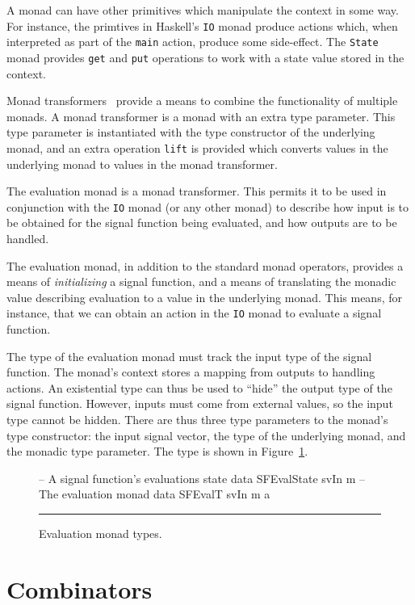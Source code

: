 A monad can have other primitives which manipulate the context in some way. For 
instance, the primtives in Haskell's {\tt IO} monad produce actions which, when
interpreted as part of the {\tt main} action, produce some side-effect. The
{\tt State} monad provides {\tt get} and {\tt put} operations to work with a 
state value stored in the context.

Monad transformers~\cite{Jones1995} provide a means to combine the functionality
of multiple monads. A monad transformer is a monad with an extra type parameter.
This type parameter is instantiated with the type constructor of the underlying
monad, and an extra operation {\tt lift} is provided which converts values in
the underlying monad to values in the monad transformer.

The evaluation monad is a monad transformer. This permits it to be used in
conjunction with the {\tt IO} monad (or any other monad) to describe how input
is to be obtained for the signal function being evaluated, and how outputs are
to be handled.

The evaluation monad, in addition to the standard monad operators, provides a
means of {\em initializing} a signal function, and a means of translating the
monadic value describing evaluation to a value in the underlying monad. This
means, for instance, that we can obtain an action in the {\tt IO} monad to
evaluate a signal function.

The type of the evaluation monad must track the input type of the signal
function. The monad's context stores a mapping from outputs to handling actions.
An existential type can thus be used to ``hide'' the output type of the signal
function. However, inputs must come from external values, so the input type
cannot be hidden. There are thus three type parameters to the monad's type
constructor: the input signal vector, the type of the underlying monad, and the
monadic type parameter. The type is shown in Figure~\ref{figure:evaluation_monad_types}.

\begin{figure}
\begin{code}
-- A signal function's evaluations state
data SFEvalState svIn m
-- The evaluation monad
data SFEvalT svIn m a
\end{code}
\hrule
\caption{Evaluation monad types.}
\label{figure:evaluation_monad_types}
\end{figure}

\section{Combinators}
\label{section:System_Design_and_Interface-Combinators}

